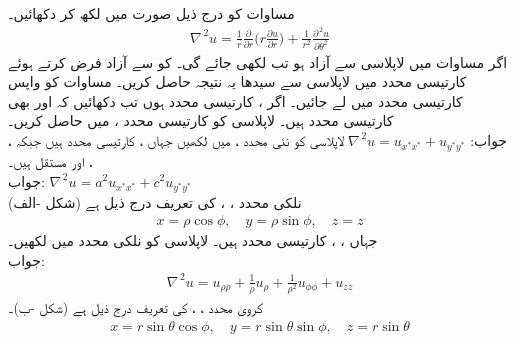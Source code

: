 \quad
مساوات  کو درج ذیل صورت میں لکھ کر دکھائیں۔
\begin{align*}
\nabla^{\,2}u=\frac{1}{r}\frac{\partial}{\partial r}\big(r\frac{\partial u}{\partial r}\big)+\frac{1}{r^2}\frac{\partial^{\,2}u}{\partial \theta^2}
\end{align*}
\quad
اگر مساوات  میں لاپلاسی  سے آزاد ہو  تب  لکھی جائے گی۔  کو  سے آزاد فرض کرتے ہوئے کارتیسی محدد میں لاپلاسی سے سیدھا  یہ نتیجہ حاصل کریں۔
\quad
مساوات  کو واپس کارتیسی محدد میں لے جائیں۔
\quad
اگر ،  کارتیسی محدد ہوں تب دکھائیں کہ  اور  بھی کارتیسی محدد ہیں۔ لاپلاسی کو کارتیسی محدد ،  میں حاصل کریں۔\\
جواب:\quad
$\nabla^{\,2}u=u_{x^*x^*}+u_{y^*y^*}$ 
\quad
لاپلاسی  کو نئی محدد ،  میں لکھیں جہاں ،  کارتیسی محدد ہیں جبکہ ، ،  اور  مستقل ہیں۔\\
جواب:\quad
$\nabla^{\,2}u=a^2u_{x^*x^*}+c^2u_{y^*y^*}$
\quad {}\\
نلکی محدد ، ،  کی تعریف درج ذیل ہے (شکل -الف)
\begin{align*}
x=\rho\cos\phi,\quad y=\rho\sin\phi,\quad z=z
\end{align*}
جہاں ، ،  کارتیسی محدد ہیں۔ لاپلاسی کو نلکی محدد میں لکھیں۔\\
جواب:\quad
\begin{align}\label{مساوات_جزوی_لاپلاسی_نلکی_محدد}
\nabla^{\,2}u=u_{\rho\rho}+\frac{1}{\rho}u_{\rho}+\frac{1}{\rho^2}u_{\phi\phi}+u_{zz}
\end{align}
\quad 
کروی محدد ، ،  کی تعریف درج ذیل ہے (شکل -ب)۔
\begin{align*}
x=r\sin\theta\cos\phi,\quad y=r\sin\theta\sin\phi,\quad z=r\sin\theta
\end{align*}
